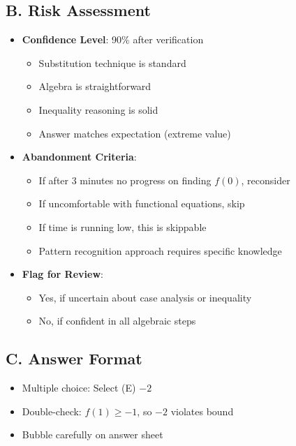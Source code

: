 \documentclass[12pt]{article}
\begin{document}
\begin{competitionbox}
\subsection*{B. Risk Assessment}
\begin{itemize}[leftmargin=*]
    \item \textbf{Confidence Level}: 90\% after verification
    \begin{itemize}
        \item Substitution technique is standard
        \item Algebra is straightforward
        \item Inequality reasoning is solid
        \item Answer matches expectation (extreme value)
    \end{itemize}
    \item \textbf{Abandonment Criteria}: 
    \begin{itemize}
        \item If after 3 minutes no progress on finding $f(0)$, reconsider
        \item If uncomfortable with functional equations, skip
        \item If time is running low, this is skippable
        \item Pattern recognition approach requires specific knowledge
    \end{itemize}
    \item \textbf{Flag for Review}: 
    \begin{itemize}
        \item Yes, if uncertain about case analysis or inequality
        \item No, if confident in all algebraic steps
    \end{itemize}
\end{itemize}

\subsection*{C. Answer Format}
\begin{itemize}[leftmargin=*]
    \item Multiple choice: Select (E) $-2$
    \item Double-check: $f(1) \geq -1$, so $-2$ violates bound \checkmark
    \item Bubble carefully on answer sheet
\end{itemize}
\end{competitionbox}
\end{document}
